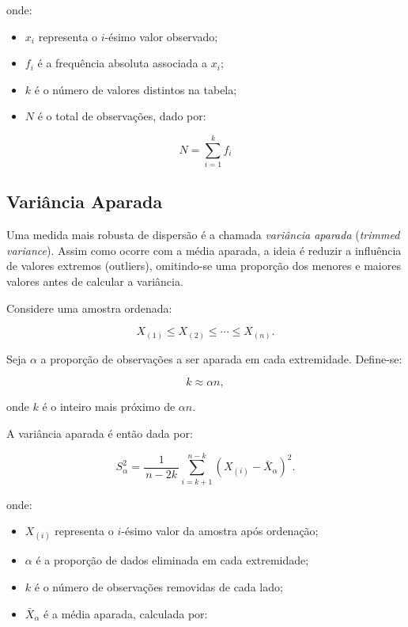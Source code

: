 onde:
\begin{itemize}
    \item $x_i$ representa o $i$-ésimo valor observado;
    \item $f_i$ é a frequência absoluta associada a $x_i$;
    \item $k$ é o número de valores distintos na tabela;
    \item $N$ é o total de observações, dado por:
\end{itemize}

\begin{equation}
N=\sum_{i=1}^{k}f_i
\end{equation}


\newpage
\subsection{Variância Aparada}

Uma medida mais robusta de dispersão é a chamada \textit{variância aparada}
(\textit{trimmed variance}). Assim como ocorre com a média aparada, a ideia é
reduzir a influência de valores extremos (outliers), omitindo-se uma proporção
dos menores e maiores valores antes de calcular a variância.

Considere uma amostra ordenada:

\[
X_{(1)} \leq X_{(2)} \leq \cdots \leq X_{(n)}.
\]

Seja $\alpha$ a proporção de observações a ser aparada em cada extremidade.
Define-se:

\[
k \approx \alpha n,
\]

onde $k$ é o inteiro mais próximo de $\alpha n$.

A variância aparada é então dada por:

\begin{equation}\label{eq:var_aparada}
S_{\alpha}^{2}
=
\frac{1}{\,n-2k\,}
\sum_{i=k+1}^{n-k}
\left(X_{(i)}-\bar{X}_{\alpha}\right)^{2}.
\end{equation}


onde:
\begin{itemize}
    \item $X_{(i)}$ representa o $i$-ésimo valor da amostra após ordenação;
    \item $\alpha$ é a proporção de dados eliminada em cada extremidade;
    \item $k$ é o número de observações removidas de cada lado;
    \item $\bar{X}_{\alpha}$ é a média aparada, calculada por:
\end{itemize}

